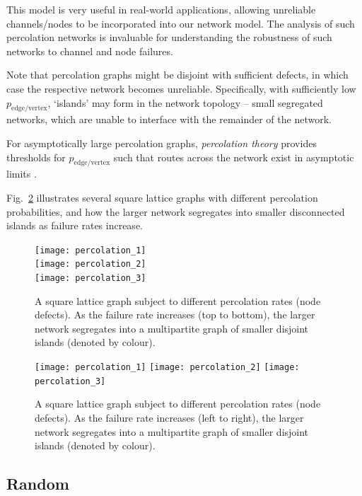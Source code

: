 This model is very useful in real-world applications, allowing unreliable channels/nodes to be incorporated into our network model. The analysis of such percolation networks is invaluable for understanding the robustness of such networks to channel and node failures.

Note that percolation graphs might be disjoint with sufficient defects, in which case the respective network becomes unreliable. Specifically, with sufficiently low $p_\mathrm{edge/vertex}$, `islands' may form in the network topology -- small segregated networks, which are unable to interface with the remainder of the network.

For asymptotically large percolation graphs, \textit{percolation theory} \cite{???} provides thresholds for $p_\mathrm{edge/vertex}$ such that routes across the network exist in asymptotic limits \cite{???}.

Fig.~\ref{fig:perc_graph} illustrates several square lattice graphs with different percolation probabilities, and how the larger network segregates into smaller disconnected islands as failure rates increase.

\doublecol
	\begin{figure}[!htbp]
	\texttt{[image: percolation\_1]}\\
	\texttt{[image: percolation\_2]}\\
	\texttt{[image: percolation\_3]}
	\captionspacefig \caption{A square lattice graph subject to different percolation rates (node defects). As the failure rate increases (top to bottom), the larger network segregates into a multipartite graph of smaller disjoint islands (denoted by colour).} \label{fig:perc_graph}
	\end{figure}
\else
	\begin{figure}[!htbp]
	\texttt{[image: percolation\_1]}
	\texttt{[image: percolation\_2]}
	\texttt{[image: percolation\_3]}
	\captionspacefig \caption{A square lattice graph subject to different percolation rates (node defects). As the failure rate increases (left to right), the larger network segregates into a multipartite graph of smaller disjoint islands (denoted by colour).} \label{fig:perc_graph}
	\end{figure}
\fi

%
%

\subsection{Random}\label{sec:rand_topol}

